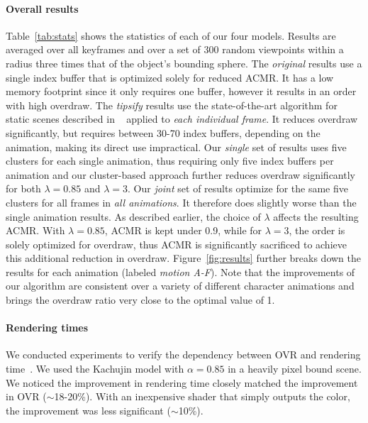 \paragraph{Overall results} Table~\ref{tab:stats} shows the statistics of each of our four models. Results are averaged over all keyframes and over a set of 300 random viewpoints within a radius three times that of the object's bounding sphere. The {\em original} results use a single index buffer that is optimized solely for reduced ACMR. It has a low memory footprint since it only requires one buffer, however it results in an order with high overdraw. The {\em tipsify} results use the state-of-the-art algorithm for static scenes described in ~\cite{Sander07} applied to {\em each individual frame}. It reduces overdraw significantly, but requires between 30-70 index buffers, depending on the animation, making its direct use impractical. Our {\em single} set of results uses five clusters for each single animation, thus requiring only five index buffers per animation and our cluster-based approach further reduces overdraw significantly for both $\lambda = 0.85$ and $\lambda = 3$. Our {\em joint} set of results optimize for the same five clusters for all frames in {\em all animations}. It therefore does slightly worse than the single animation results. As described earlier, the choice of $\lambda$ affects the resulting ACMR. With $\lambda = 0.85$, ACMR is kept under 0.9, while for $\lambda = 3$, the order is solely optimized for overdraw, thus ACMR is significantly sacrificed to achieve this additional reduction in overdraw. Figure~\ref{fig:results} further breaks down the results for each animation (labeled {\em motion A-F}). Note that the improvements of our algorithm are consistent over a variety of different character animations and brings the overdraw ratio very close to the optimal value of 1.

\paragraph{Rendering times} We conducted experiments to verify the dependency between OVR and rendering time~\citep{Sander07}. We used the Kachujin model with $\alpha=0.85$ in a heavily pixel bound scene. We noticed the improvement in rendering time closely matched the improvement in OVR ($\sim$18-20\%). With an inexpensive shader that simply outputs the color, the improvement was less significant ($\sim$10\%).

